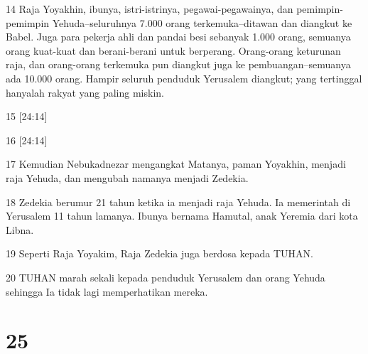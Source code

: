 \par 14 Raja Yoyakhin, ibunya, istri-istrinya, pegawai-pegawainya, dan pemimpin-pemimpin Yehuda--seluruhnya 7.000 orang terkemuka--ditawan dan diangkut ke Babel. Juga para pekerja ahli dan pandai besi sebanyak 1.000 orang, semuanya orang kuat-kuat dan berani-berani untuk berperang. Orang-orang keturunan raja, dan orang-orang terkemuka pun diangkut juga ke pembuangan--semuanya ada 10.000 orang. Hampir seluruh penduduk Yerusalem diangkut; yang tertinggal hanyalah rakyat yang paling miskin.
\par 15 [24:14]
\par 16 [24:14]
\par 17 Kemudian Nebukadnezar mengangkat Matanya, paman Yoyakhin, menjadi raja Yehuda, dan mengubah namanya menjadi Zedekia.
\par 18 Zedekia berumur 21 tahun ketika ia menjadi raja Yehuda. Ia memerintah di Yerusalem 11 tahun lamanya. Ibunya bernama Hamutal, anak Yeremia dari kota Libna.
\par 19 Seperti Raja Yoyakim, Raja Zedekia juga berdosa kepada TUHAN.
\par 20 TUHAN marah sekali kepada penduduk Yerusalem dan orang Yehuda sehingga Ia tidak lagi memperhatikan mereka.

\chapter{25}

